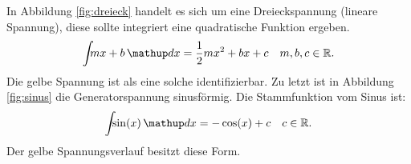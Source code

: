 In Abbildung \ref{fig:dreieck} handelt es sich um eine Dreieckspannung (lineare Spannung),
diese sollte integriert eine quadratische Funktion ergeben.
\begin{equation*}
   \int\!\!\! mx+b \dv{x}= \frac{1}{2}mx^2+bx+c \quad m,b,c\in\mathbb{R}.
\end{equation*}
Die gelbe Spannung ist als eine solche identifizierbar.
Zu letzt ist in Abbildung \ref{fig:sinus} die Generatorspannung sinusförmig.
Die Stammfunktion vom Sinus ist:
\begin{equation*}
  \int\!\!\! \sin(x)\dv{x}=-\cos(x)+c \quad c\in \mathbb{R}.
\end{equation*}
Der gelbe Spannungsverlauf besitzt diese Form.
